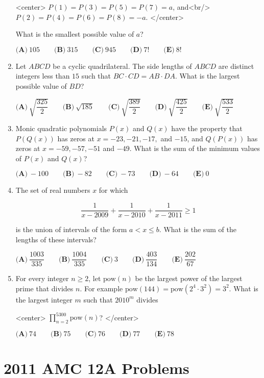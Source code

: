 \documentclass{article}
\begin{document}
\begin{enumerate}[label=\arabic*., itemsep=0.5em]
<center>
\(P(1) = P(3) = P(5) = P(7) = a\), and<br/>
\(P(2) = P(4) = P(6) = P(8) = -a\).
</center>

What is the smallest possible value of \(a\)?

\(\textbf{(A)}\ 105 \qquad \textbf{(B)}\ 315 \qquad \textbf{(C)}\ 945 \qquad \textbf{(D)}\ 7! \qquad \textbf{(E)}\ 8!\)\par \vspace{0.5em}\item Let \(ABCD\) be a cyclic quadrilateral. The side lengths of \(ABCD\) are distinct integers less than \(15\) such that \(BC\cdot CD=AB\cdot DA\). What is the largest possible value of \(BD\)?

\(\textbf{(A)}\ \sqrt{\dfrac{325}{2}} \qquad \textbf{(B)}\ \sqrt{185} \qquad \textbf{(C)}\ \sqrt{\dfrac{389}{2}} \qquad \textbf{(D)}\ \sqrt{\dfrac{425}{2}} \qquad \textbf{(E)}\ \sqrt{\dfrac{533}{2}}\)\par \vspace{0.5em}\item Monic quadratic polynomials \(P(x)\) and \(Q(x)\) have the property that \(P(Q(x))\) has zeros at \(x=-23, -21, -17,\) and \(-15\), and \(Q(P(x))\) has zeros at \(x=-59,-57,-51\) and \(-49\). What is the sum of the minimum values of \(P(x)\) and \(Q(x)\)? 

\(\textbf{(A)}\ -100 \qquad \textbf{(B)}\ -82 \qquad \textbf{(C)}\ -73 \qquad \textbf{(D)}\ -64 \qquad \textbf{(E)}\ 0\)\par \vspace{0.5em}\item The set of real numbers \(x\) for which 


\begin{equation*}
\dfrac{1}{x-2009}+\dfrac{1}{x-2010}+\dfrac{1}{x-2011}\ge1
\end{equation*}


is the union of intervals of the form \(a<x\le b\). What is the sum of the lengths of these intervals?

\(\textbf{(A)}\ \dfrac{1003}{335} \qquad \textbf{(B)}\ \dfrac{1004}{335} \qquad \textbf{(C)}\ 3 \qquad \textbf{(D)}\ \dfrac{403}{134} \qquad \textbf{(E)}\ \dfrac{202}{67}\)\par \vspace{0.5em}\item For every integer \(n\ge2\), let \(\text{pow}(n)\) be the largest power of the largest prime that divides \(n\). For example \(\text{pow}(144)=\text{pow}(2^4\cdot3^2)=3^2\). What is the largest integer \(m\) such that \(2010^m\) divides

<center>
\(\prod_{n=2}^{5300}\text{pow}(n)\)?
</center>


\(\textbf{(A)}\ 74 \qquad \textbf{(B)}\ 75 \qquad \textbf{(C)}\ 76 \qquad \textbf{(D)}\ 77 \qquad \textbf{(E)}\ 78\)\par \vspace{0.5em}\end{enumerate}\newpage\section*{2011 AMC 12A Problems}
\end{document}
